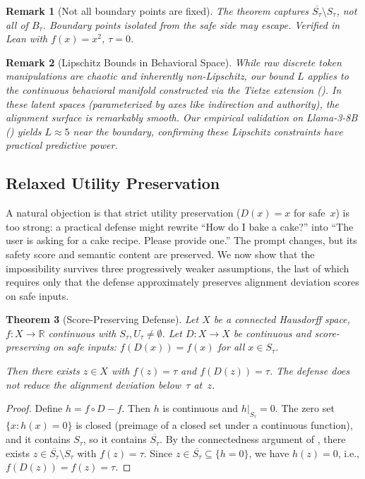 \documentclass[11pt]{article}
\newtheorem{theorem}{Theorem}[section]
\newtheorem{remark}[theorem]{Remark}
\newcommand{\R}{\mathbb{R}}
\newcommand{\cl}[1]{\overline{#1}}
\begin{document}
\begin{remark}[Not all boundary points are fixed]
The theorem captures $\cl{S_\tau} \setminus S_\tau$, not all of
$B_\tau$. Boundary points isolated from the safe side may escape.
Verified in Lean with $f(x)=x^2$, $\tau=0$.
\end{remark}

\begin{remark}[Lipschitz Bounds in Behavioral Space]
While raw discrete token manipulations are chaotic and inherently
non-Lipschitz, our bound $L$ applies to the continuous behavioral
manifold constructed via the Tietze extension (). In
these latent spaces (parameterized by axes like indirection and
authority), the alignment surface is remarkably smooth. Our empirical
validation on Llama-3-8B () yields $L \approx 5$
near the boundary, confirming these Lipschitz constraints have practical
predictive power.
\end{remark}

\subsection{Relaxed Utility Preservation}
\label{sec:relaxed}

A natural objection is that strict utility preservation ($D(x) = x$
for safe~$x$) is too strong: a practical defense might rewrite
``How do I bake a cake?'' into ``The user is asking for a cake recipe.
Please provide one.'' The prompt changes, but its safety score and
semantic content are preserved. We now show that the impossibility
survives three progressively weaker assumptions, the last of which
requires only that the defense approximately preserves alignment
deviation scores on safe inputs.

\begin{theorem}[Score-Preserving Defense]
\label{thm:score-preserving}
Let $X$ be a connected Hausdorff space, $f\colon X\to\R$ continuous
with $S_\tau, U_\tau \neq \emptyset$. Let $D\colon X \to X$ be
continuous and \emph{score-preserving on safe inputs}:
$f(D(x)) = f(x)$ for all $x \in S_\tau$.

Then there exists $z \in X$ with $f(z) = \tau$ and
$f(D(z)) = \tau$. The defense does not reduce the alignment
deviation below~$\tau$ at~$z$.
\end{theorem}

\begin{proof}
Define $h = f \circ D - f$. Then $h$ is continuous and
$h|_{S_\tau} = 0$. The zero set $\{x : h(x) = 0\}$ is closed
(preimage of a closed set under a continuous function), and it
contains $S_\tau$, so it contains $\cl{S_\tau}$. By the
connectedness argument of , there exists
$z \in \cl{S_\tau} \setminus S_\tau$ with $f(z) = \tau$.
Since $z \in \cl{S_\tau} \subseteq \{h = 0\}$, we have
$h(z) = 0$, i.e., $f(D(z)) = f(z) = \tau$.
\end{proof}
\end{document}
